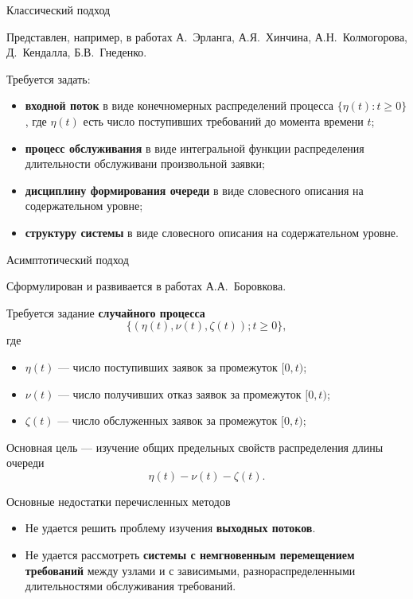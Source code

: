 \documentclass[10pt]{beamer}
\begin{document}
\begin{frame}{Классический подход}
\begin{block}{}
Представлен, например, в работах А.~Эрланга, А.Я.~Хинчина, А.Н.~Колмогорова, Д.~Кендалла, Б.В.~Гнеденко.
\end{block}

  Требуется задать:
  \begin{itemize}
  \item \textbf{входной поток} в виде конечномерных распределений процесса $\{\eta(t) \colon t \geqslant 0\}$, где $\eta(t)$ есть число поступивших требований до момента времени $t$;
  \item \textbf{процесс обслуживания} в виде интегральной функции
    распределения длительности обслуживани произвольной заявки;
  \item \textbf{дисциплину формирования очереди} в виде словесного описания на
    содержательном уровне;
  \item \textbf{структуру системы} в виде словесного описания на
    содержательном уровне.
  \end{itemize}
\end{frame}


\begin{frame}{Асимптотический подход}
\begin{block}{}
Сформулирован и развивается в работах А.А.~Боровкова.
\end{block}

  Требуется задание \textbf{случайного процесса} \[\{(\eta(t),
  \nu(t), \zeta(t));t\geqslant0\}, \] где 
  \begin{itemize}
  \item $\eta(t)$ --- число поступивших заявок за промежуток $[0,t)$;
  \item $\nu(t)$ --- число получивших отказ заявок за промежуток $[0,t)$;
  \item $\zeta(t)$ --- число обслуженных заявок за промежуток $[0,t)$;
  \end{itemize}
  Основная цель --- изучение общих предельных свойств распределения
  длины очереди \[\eta(t)-\nu(t)-\zeta(t). \]
\end{frame}

\begin{frame}{Основные недостатки перечисленных методов}
  \begin{itemize}
  \item Не удается решить проблему изучения \textbf{выходных потоков}.
    \bigskip
  \item Не удается рассмотреть \textbf{системы с немгновенным перемещением требований} между узлами и с зависимыми, разнораспределенными длительностями обслуживания требований.
  \end{itemize}
\end{frame}
\end{document}
